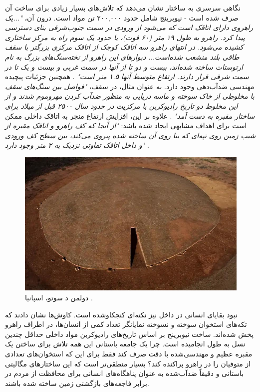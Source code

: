 \documentclass[10pt,twocolumn,letterpaper]{article}
\begin{document}
نگاهی سرسری به ساختار نشان می‌دهد که تلاش‌های بسیار زیادی برای ساخت آن صرف شده است - نیوبرینج شامل حدود ۲۰۰,۰۰۰ تن مواد است. درون آن، \textit{"...یک راهروی دارای اتاقک است که می‌شود از ورودی در سمت جنوب‌شرقی بنای دسترسی پیدا کرد. راهرو به طول ۱۹ متر (۶۰ فوت)، یا حدود یک سوم راه به مرکز ساختاری کشیده می‌شود. در انتهای راهرو سه اتاقک کوچک از اتاقک مرکزی بزرگتر با سقف طاقی بلند منشعب شده‌است... دیوارهای این راهرو از تخته‌سنگ‌های بزرگ به نام ارتوستات ساخته شده‌اند، بیست و دو تا از آنها در سمت غربی و بیست و یک تا در سمت شرقی قرار دارند. ارتفاع متوسط آنها ۱.۵ متر است"} \cite{70}. همچنین جزئیات پیچیده مهندسی ضدآب‌دهی وجود دارد. به عنوان مثال، در سقف، \textit{"فواصل بین سنگ‌های سقف با مخلوطی از خاک سوخته و ماسه دریایی به منظور ضدآب کردن مهروموم شدند و از این مخلوط دو تاریخ رادیوکربن با مرکزیت در حدود سال ۲۵۰۰ قبل از میلاد برای ساختار مقبره به دست آمد"} \cite{71}. علاوه بر این، افزایش ارتفاع منجر به اتاقک داخلی ممکن است برای اهداف مشابهی ایجاد شده باشد: \textit{"از آنجا که کف راهرو و اتاقک مقبره از شیب زمین روی تپه‌ای که بنا روی آن ساخته شده پیروی می‌کند، بین سطح کف ورودی و داخل اتاقک تفاوتی نزدیک به ۲ متر وجود دارد"} \cite{71}.

\begin{figure}[b]
\begin{center}
   \includegraphics[width=1\linewidth]{dolmen.jpg}
\end{center}
   \caption{دولمن د سوتو، اسپانیا \cite{53}.}
\label{fig:9}
\label{fig:onecol}
\end{figure}

نبود بقایای انسانی در داخل نیز نکته‌ای کنجکاوشده است. کاوش‌ها نشان دادند که تکه‌های استخوان سوخته و نسوخته نمایانگر تعداد کمی از انسان‌ها، در اطراف راهرو پخش شده‌اند. ساخت نیوبرینج بر اساس تاریخ‌های رادیوکربن مواد داخلی حداقل چندین نسل به طول انجامیده است. چرا یک جامعه باستانی این همه تلاش برای ساختن یک مقبره عظیم و مهندسی‌شده با دقت صرف کند فقط برای این که استخوان‌های تعدادی از متوفیان را در راهرو پراکنده کند؟ بسیار منطقی‌تر است که این ساختارهای مگالیتی باستانی و دقیقاً ضدآب‌شده به عنوان پناهگاه‌های انسانی برای محافظت از مردم در برابر فاجعه‌های بازگشتی زمین ساخته شده باشند.
\end{document}
